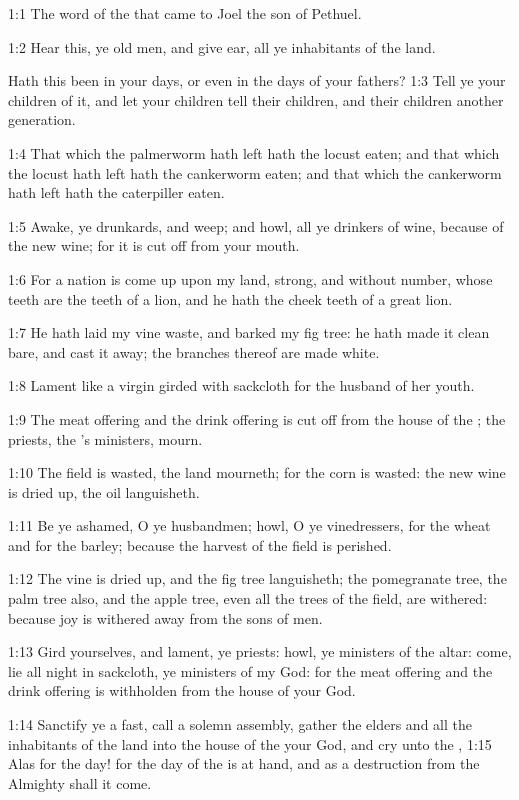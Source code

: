 

1:1 The word of the \LORD that came to Joel the son of Pethuel.

1:2 Hear this, ye old men, and give ear, all ye inhabitants of the land.

Hath this been in your days, or even in the days of your fathers?  1:3
Tell ye your children of it, and let your children tell their
children, and their children another generation.

1:4 That which the palmerworm hath left hath the locust eaten; and
that which the locust hath left hath the cankerworm eaten; and that
which the cankerworm hath left hath the caterpiller eaten.

1:5 Awake, ye drunkards, and weep; and howl, all ye drinkers of wine,
because of the new wine; for it is cut off from your mouth.

1:6 For a nation is come up upon my land, strong, and without number,
whose teeth are the teeth of a lion, and he hath the cheek teeth of a
great lion.

1:7 He hath laid my vine waste, and barked my fig tree: he hath made
it clean bare, and cast it away; the branches thereof are made white.

1:8 Lament like a virgin girded with sackcloth for the husband of her
youth.

1:9 The meat offering and the drink offering is cut off from the house
of the \LORD; the priests, the \LORD's ministers, mourn.

1:10 The field is wasted, the land mourneth; for the corn is wasted:
the new wine is dried up, the oil languisheth.

1:11 Be ye ashamed, O ye husbandmen; howl, O ye vinedressers, for the
wheat and for the barley; because the harvest of the field is
perished.

1:12 The vine is dried up, and the fig tree languisheth; the
pomegranate tree, the palm tree also, and the apple tree, even all the
trees of the field, are withered: because joy is withered away from
the sons of men.

1:13 Gird yourselves, and lament, ye priests: howl, ye ministers of
the altar: come, lie all night in sackcloth, ye ministers of my God:
for the meat offering and the drink offering is withholden from the
house of your God.

1:14 Sanctify ye a fast, call a solemn assembly, gather the elders and
all the inhabitants of the land into the house of the \LORD your God,
and cry unto the \LORD, 1:15 Alas for the day! for the day of the \LORD
is at hand, and as a destruction from the Almighty shall it come.

